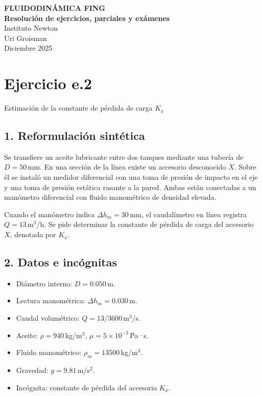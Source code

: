 \documentclass[12pt, a4paper]{article}
\newcommand{\TituloEjercicio}{
    \begin{center}
        {\Large \textbf{FLUIDODINÁMICA FING}}\\[0.3em]
        {\large \textbf{Resolución de ejercicios, parciales y exámenes}}\\[0.8em]
        {\normalsize Instituto Newton}\\
        {\normalsize Uri Groisman}\\
        {\normalsize Diciembre 2025} %
    \end{center}

    \vspace{2em}
}
\begin{document}
\TituloEjercicio


\section*{Ejercicio e.2}

{\small Estimación de la constante de pérdida de carga $K_x$ }

\vspace{1.5em}





\subsection*{1. Reformulación sintética}

Se transfiere un aceite lubricante entre dos tanques mediante una tubería de $D=50\,$mm. 
En una sección de la línea existe un accesorio desconocido $X$. Sobre él se instaló un medidor diferencial con una toma de presión de impacto en el eje y una toma de presión estática rasante a la pared. Ambas están conectadas a un manómetro diferencial con fluido manométrico de densidad elevada. 

Cuando el manómetro indica $\Delta h_m=30\,$mm, el caudalímetro en línea registra $Q = 13\,$m$^3$/h. 
Se pide determinar la constante de pérdida de carga del accesorio $X$, denotada por $K_x$.


\subsection*{2. Datos e incógnitas}

\begin{itemize}
  \item Diámetro interno: $D = 0.050\,$m.
  \item Lectura manométrica: $\Delta h_m = 0.030\,$m.
  \item Caudal volumétrico: $Q = 13/3600\,$m$^3$/s.
  \item Aceite: $\rho = 940\,$kg/m$^3$, \quad $\mu = 5\times 10^{-3}\,$Pa·s.
  \item Fluido manométrico: $\rho_m = 13500\,$kg/m$^3$.
  \item Gravedad: $g = 9.81\,$m/s$^2$.
  \item Incógnita: constante de pérdida del accesorio $K_x$.
\end{itemize}
\end{document}
